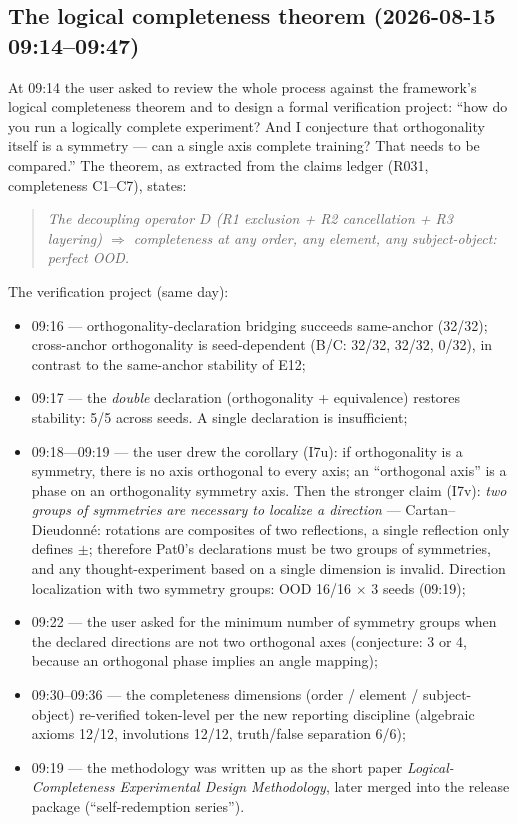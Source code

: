 \documentclass[sigplan,10pt,anonymous,review]{acmart}
\begin{document}
\subsection{The logical completeness theorem (2026-08-15 09:14--09:47)}

At 09:14 the user asked to review the whole process against the framework's
logical completeness theorem and to design a formal verification project:
``how do you run a logically complete experiment? And I conjecture that
orthogonality itself is a symmetry --- can a single axis complete training?
That needs to be compared.'' The theorem, as extracted from the claims
ledger (R031, completeness C1--C7), states:

\begin{quote}
\emph{The decoupling operator $D$ (R1 exclusion + R2 cancellation + R3
layering) $\Longrightarrow$ completeness at any order, any element, any
subject-object: perfect OOD.}
\end{quote}

The verification project (same day):
\begin{itemize}
\item 09:16 --- orthogonality-declaration bridging succeeds same-anchor
  (32/32); cross-anchor orthogonality is seed-dependent (B/C: 32/32, 32/32,
  0/32), in contrast to the same-anchor stability of E12;
\item 09:17 --- the \emph{double} declaration (orthogonality + equivalence)
  restores stability: 5/5 across seeds. A single declaration is insufficient;
\item 09:18---09:19 --- the user drew the corollary (I7u): if orthogonality
  is a symmetry, there is no axis orthogonal to every axis; an ``orthogonal
  axis'' is a phase on an orthogonality symmetry axis. Then the stronger
  claim (I7v): \emph{two groups of symmetries are necessary to localize a
  direction} --- Cartan--Dieudonn\'e: rotations are composites of two
  reflections, a single reflection only defines $\pm$; therefore Pat0's
  declarations must be two groups of symmetries, and any thought-experiment
  based on a single dimension is invalid. Direction localization with two
  symmetry groups: OOD 16/16 $\times$ 3 seeds (09:19);
\item 09:22 --- the user asked for the minimum number of symmetry groups when
  the declared directions are not two orthogonal axes (conjecture: 3 or 4,
  because an orthogonal phase implies an angle mapping);
\item 09:30--09:36 --- the completeness dimensions (order / element /
  subject-object) re-verified token-level per the new reporting discipline
  (algebraic axioms 12/12, involutions 12/12, truth/false separation 6/6);
\item 09:19 --- the methodology was written up as the short paper
  \emph{Logical-Completeness Experimental Design Methodology}, later merged
  into the release package (``self-redemption series'').
\end{itemize}
\end{document}
